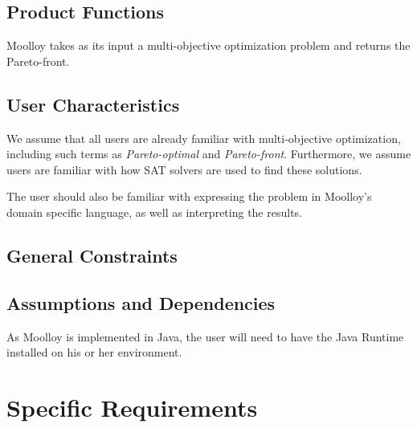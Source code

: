 \documentclass[11pt]{article}
\theoremstyle{definition}
\begin{document}
\subsection{Product Functions}

Moolloy takes as its input a multi-objective optimization problem and
returns the Pareto-front.

\subsection{User Characteristics}

We assume that all users are already familiar with multi-objective
optimization, including such terms as \textit{Pareto-optimal} and
\textit{Pareto-front}. Furthermore, we assume users are familiar with
how SAT solvers are used to find these solutions.

The user should also be familiar with expressing the problem in
Moolloy's domain specific language, as well as interpreting the
results.

\subsection{General Constraints}

\subsection{Assumptions and Dependencies}

As Moolloy is implemented in Java, the user will need to have the Java
Runtime installed on his or her environment.

\section{Specific Requirements}


\printbibliography
\end{document}
